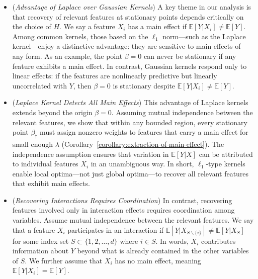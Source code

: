\documentclass[sn-mathphys-num]{sn-jnl}%
\numberwithin{equation}{section}
\newcommand{\E}{\mathbb{E}}
\theoremstyle{thmstyleone}%
\theoremstyle{thmstyletwo}%
\theoremstyle{thmstylethree}%
\begin{document}
\vspace{.3em}
\begin{itemize}
\item (\emph{Advantage of Laplace over Gaussian Kernels})
A key theme in our analysis is that recovery of relevant features at stationary points depends critically on the choice of $H$. We say a feature $X_i$ has a main effect if $\mathbb{E}[Y | X_i] \ne \E[Y]$. Among common kernels, those based on the $\ell_1$ norm---such as the Laplace kernel---enjoy a distinctive advantage: they are sensitive to main effects of any form. %
As an example, the point $\beta = 0$ can never be stationary if any feature exhibits a main effect. In contrast, Gaussian kernels respond only to linear effects: if the features are nonlinearly predictive but linearly uncorrelated with $Y$, then $\beta=0$ is stationary despite $\E[Y|X_i]\ne \E[Y]$.


\vspace{.3em}
\item (\emph{Laplace Kernel Detects All Main Effects})
This advantage of Laplace kernels extends beyond the origin $\beta = 0$. Assuming mutual independence between the relevant features, we show that within any bounded region, every stationary point $\beta_\dagger$ must assign nonzero weights to features that carry a main effect for small enough $\lambda$ (Corollary~\ref{corollary:extraction-of-main-effect}). The independence assumption ensures that variation in $\mathbb{E}[Y | X]$ can be attributed to individual features $X_i$ in an unambiguous way. In short, $\ell_1$-type kernels enable local optima---not just global optima---to recover all relevant features that exhibit main effects. 

\vspace{.3em}
\item (\emph{Recovering Interactions Requires Coordination})
In contrast, recovering features involved only in interaction effects requires coordination among variables. Assume mutual independence between the relevant features. We say that a feature $X_i$ participates in an interaction if $\E[Y|X_{S \backslash \{i\}}] \ne \E[Y|X_S]$ for some index set $S \subset \{1, 2, \ldots, d\}$ where $i \in S$. In words, $X_i$ contributes information about $Y$ beyond what is already contained in the other variables of $S$.  We further assume that $X_i$ has no main effect, meaning $\mathbb{E}[Y | X_i] = \mathbb{E}[Y]$. 


\end{itemize}
\end{document}
